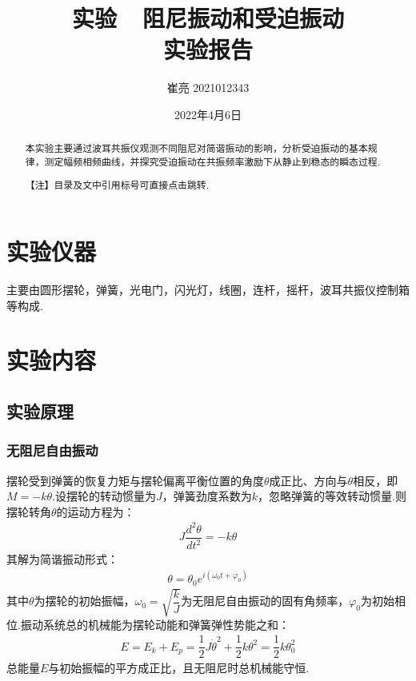 \documentclass[12pt,a4paper,oneside,left=3.18,right=3.18,top=2.54,bottom=2.54]{ctexart}
\title{实验\ \ 阻尼振动和受迫振动\\实验报告}%
\author{崔亮 2021012343}%
\date{2022年4月6日}%
\begin{document}
\maketitle%
\begin{abstract}
本实验主要通过波耳共振仪观测不同阻尼对简谐振动的影响，分析受迫振动的基本规律，测定幅频相频曲线，并探究受迫振动在共振频率激励下从静止到稳态的瞬态过程.\par
\vspace{\fill}\noindent【注】目录及文中引用标号可直接点击跳转.
\end{abstract}%
\newpage%
\tableofcontents%
\newpage
\newcommand\degree{^\circ}%

\section{实验仪器}
	\par
	主要由圆形摆轮，弹簧，光电门，闪光灯，线圈，连杆，摇杆，波耳共振仪控制箱等构成.

\section{实验内容}

	\subsection{实验原理}

		\subsubsection{无阻尼自由振动}
			摆轮受到弹簧的恢复力矩与摆轮偏离平衡位置的角度$\theta$成正比、方向与$\theta$相反，即$M=-k\theta$.设摆轮的转动惯量为$J$，弹簧劲度系数为$k$，忽略弹簧的等效转动惯量.则摆轮转角$\theta$的运动方程为：
			\begin{align}
			J\dfrac{d^2\theta}{dt^2}=-k\theta
			\end{align}
			其解为简谐振动形式：
			\begin{align}
			\theta=\theta_0e^{i(\omega_0t+\varphi_0)}
			\end{align}
			其中$\theta$为摆轮的初始振幅，$\omega_0=\sqrt{\dfrac{k}{J}}$为无阻尼自由振动的固有角频率，$\varphi_0$为初始相位.振动系统总的机械能为摆轮动能和弹簧弹性势能之和：
			\begin{equation}
			\begin{aligned}
			E=E_k+E_p=\dfrac{1}{2}J\dot{\theta}^2+\dfrac{1}{2}k\theta^2=\dfrac{1}{2}k\theta_0^2
			\end{aligned}
			\label{ziyou}
			\end{equation}
			总能量$E$与初始振幅的平方成正比，且无阻尼时总机械能守恒.\par
\end{document}
